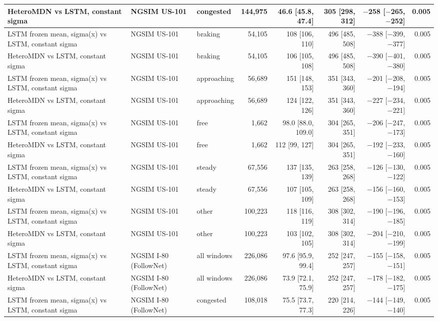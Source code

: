 \begin{longtable}{lllrrrrr}
\midrule
HeteroMDN vs LSTM, constant sigma & NGSIM US-101 & congested & 144,975 & 46.6 [45.8, 47.4] & 305 [298, 312] & $-$258 [$-$265, $-$252] & 0.005 \\
\midrule
LSTM frozen mean, sigma(x) vs LSTM, constant sigma & NGSIM US-101 & braking & 54,105 & 108 [106, 110] & 496 [485, 508] & $-$388 [$-$399, $-$377] & 0.005 \\
\midrule
HeteroMDN vs LSTM, constant sigma & NGSIM US-101 & braking & 54,105 & 106 [105, 108] & 496 [485, 508] & $-$390 [$-$401, $-$380] & 0.005 \\
\midrule
LSTM frozen mean, sigma(x) vs LSTM, constant sigma & NGSIM US-101 & approaching & 56,689 & 151 [148, 153] & 351 [343, 360] & $-$201 [$-$208, $-$194] & 0.005 \\
\midrule
HeteroMDN vs LSTM, constant sigma & NGSIM US-101 & approaching & 56,689 & 124 [122, 126] & 351 [343, 360] & $-$227 [$-$234, $-$221] & 0.005 \\
\midrule
LSTM frozen mean, sigma(x) vs LSTM, constant sigma & NGSIM US-101 & free & 1,662 & 98.0 [88.0, 109.0] & 304 [265, 351] & $-$206 [$-$247, $-$173] & 0.005 \\
\midrule
HeteroMDN vs LSTM, constant sigma & NGSIM US-101 & free & 1,662 & 112 [99, 127] & 304 [265, 351] & $-$192 [$-$233, $-$160] & 0.005 \\
\midrule
LSTM frozen mean, sigma(x) vs LSTM, constant sigma & NGSIM US-101 & steady & 67,556 & 137 [135, 139] & 263 [258, 268] & $-$126 [$-$130, $-$122] & 0.005 \\
\midrule
HeteroMDN vs LSTM, constant sigma & NGSIM US-101 & steady & 67,556 & 107 [105, 109] & 263 [258, 268] & $-$156 [$-$160, $-$153] & 0.005 \\
\midrule
LSTM frozen mean, sigma(x) vs LSTM, constant sigma & NGSIM US-101 & other & 100,223 & 118 [116, 119] & 308 [302, 314] & $-$190 [$-$196, $-$185] & 0.005 \\
\midrule
HeteroMDN vs LSTM, constant sigma & NGSIM US-101 & other & 100,223 & 103 [102, 105] & 308 [302, 314] & $-$204 [$-$210, $-$199] & 0.005 \\
\midrule
LSTM frozen mean, sigma(x) vs LSTM, constant sigma & NGSIM I-80 (FollowNet) & all windows & 226,086 & 97.6 [95.9, 99.4] & 252 [247, 257] & $-$155 [$-$158, $-$151] & 0.005 \\
\midrule
HeteroMDN vs LSTM, constant sigma & NGSIM I-80 (FollowNet) & all windows & 226,086 & 73.9 [72.1, 75.9] & 252 [247, 257] & $-$178 [$-$182, $-$175] & 0.005 \\
\midrule
LSTM frozen mean, sigma(x) vs LSTM, constant sigma & NGSIM I-80 (FollowNet) & congested & 108,018 & 75.5 [73.7, 77.3] & 220 [214, 226] & $-$144 [$-$149, $-$140] & 0.005 \\

\end{longtable}

